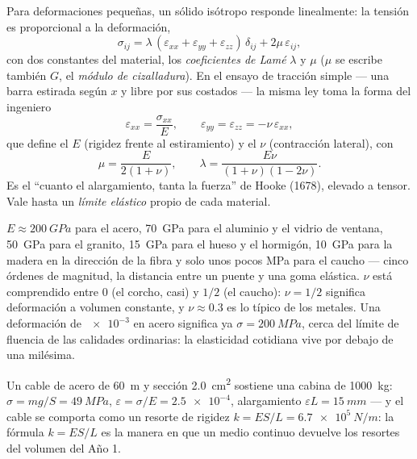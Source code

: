 \begin{theorem}\label{thm:b3:continuum-elasticity:hooke}
Para deformaciones pequeñas, un sólido isótropo responde linealmente: la
tensión es proporcional a la deformación,
\[
\sigma_{ij} = \lambda\,(\varepsilon_{xx} + \varepsilon_{yy} +
\varepsilon_{zz})\,\delta_{ij} + 2\mu\,\varepsilon_{ij} ,
\]
con dos constantes del material, los \emph{coeficientes de Lamé} $\lambda$ y
$\mu$ ($\mu$ se escribe también $G$, el \emph{módulo de cizalladura}). En el
ensayo de tracción simple --- una barra estirada según $x$ y libre por sus
costados --- la misma ley toma la forma del ingeniero
\[
\varepsilon_{xx} = \frac{\sigma_{xx}}{E} , \qquad
\varepsilon_{yy} = \varepsilon_{zz} = -\nu\,\varepsilon_{xx} ,
\]
que define el \emph{} $E$ (rigidez frente al estiramiento) y
el \emph{} $\nu$ (contracción lateral), con
\[
\mu = \frac{E}{2(1 + \nu)} , \qquad
\lambda = \frac{E\nu}{(1 + \nu)(1 - 2\nu)} .
\]
Es el ``cuanto el alargamiento, tanta la fuerza'' de Hooke (1678), elevado
a tensor. Vale hasta un \emph{límite elástico} propio de cada material.
\end{theorem}
\admitted

\begin{remark}\label{rem:b3:continuum-elasticity:orders}
$E \approx \qty{200}{GPa}$ para el acero, \qty{70}{GPa} para el aluminio y
el vidrio de ventana, \qty{50}{GPa} para el granito, \qty{15}{GPa} para el
hueso y el hormigón, \qty{10}{GPa} para la madera en la dirección de la
fibra y solo unos pocos MPa para el caucho --- cinco órdenes de magnitud,
la distancia entre un puente y una goma elástica. $\nu$ está comprendido
entre $0$ (el corcho, casi) y $1/2$ (el caucho): $\nu = 1/2$ significa
deformación a volumen constante, y $\nu \approx 0.3$ es lo típico de los
metales. Una deformación de $\num{e-3}$ en acero significa ya
$\sigma = \qty{200}{MPa}$, cerca del límite de fluencia de las calidades
ordinarias: la elasticidad cotidiana vive por debajo de una milésima.
\end{remark}

\begin{example}\label{ex:b3:continuum-elasticity:cable}
Un cable de acero de \qty{60}{m} y sección \qty{2.0}{cm^2} sostiene una
cabina de \qty{1000}{kg}: $\sigma = mg/S = \qty{49}{MPa}$, $\varepsilon =
\sigma/E = \num{2.5e-4}$, alargamiento $\varepsilon L = \qty{15}{mm}$ ---
y el cable se comporta como un resorte de rigidez $k = ES/L =
\qty{6.7e5}{N/m}$: la fórmula $k = ES/L$ es la manera en que un medio
continuo devuelve los resortes del volumen del Año 1.
\end{example}

